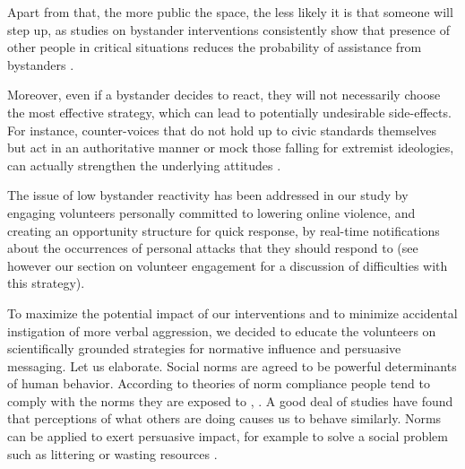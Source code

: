 \documentclass[preprint,12pt]{elsarticle}
\begin{document}
Apart from that, the more public the space, the less likely it is that someone will step up, as studies on bystander interventions consistently show that presence of other people in critical situations reduces the probability of assistance from bystanders \citep{fischer2011bystander}. %

Moreover, even if a bystander decides to react, they will not necessarily choose the most effective strategy, which can lead to potentially undesirable side-effects. For instance,  counter-voices that do not hold up to civic standards themselves but act in an authoritative manner or mock those falling for extremist ideologies, can actually strengthen the underlying attitudes \citep{ziegele2018journalistic, schieb2016governing, legault2011ironic}.

The issue of low bystander reactivity has been addressed in our study by engaging volunteers personally committed to lowering online violence, and creating an opportunity structure for quick response, by real-time notifications about the occurrences of personal attacks that they should respond to (see however our section on volunteer engagement for a discussion of difficulties with this strategy).

To maximize the potential impact of our interventions and to minimize  accidental instigation of more verbal aggression, we decided to educate the volunteers on scientifically grounded strategies for normative influence and persuasive messaging.  Let us elaborate.
 Social norms are agreed to be powerful determinants of human behavior. 
According to theories of norm compliance people tend to comply with the norms they are exposed to \citep{morris2018common}, \citep{cialdini1990focus}.  A good deal of studies have found that perceptions of what others are doing causes us to behave similarly. Norms can be applied to exert persuasive impact, for example to solve a social problem such as littering or wasting resources \citep{cialdini2006managing, cialdini1990focus, goldstein2008room}. 


\end{document}
